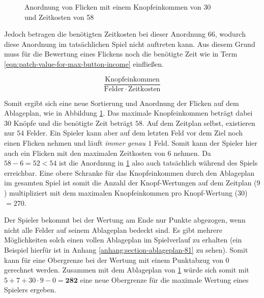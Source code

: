 \begin{figure}[!ht]
\begin{minipage}{.48\textwidth}
        \captionsetup{format=plain, singlelinecheck=false}
        \setcapindent{0pt}
        \caption{Anordnung von Flicken mit einem Knopfeinkommen von 30 \\ und Zeitkosten von 58}
        \label{fig:quilt-board-real-max-button-income}
    \end{minipage}
\end{figure}

Jedoch betragen die benötigten Zeitkosten bei dieser Anordnung $66$, wodurch diese Anordnung im tatsächlichen Spiel nicht auftreten kann. Aus diesem Grund muss für die Bewertung eines Flickens noch die benötigte Zeit wie in Term \ref{eqn:patch-value-for-max-button-income} einfließen.

\begin{equation}
    \label{eqn:patch-value-for-max-button-income}
    \frac{\text{Knopfeinkommen}}{\text{Felder}\, \cdot\, \text{Zeitkosten}}
\end{equation}

Somit ergibt sich eine neue Sortierung und Anordnung der Flicken auf dem Ablageplan, wie in Abbildung \ref{fig:quilt-board-real-max-button-income}. Das maximale Knopfeinkommen beträgt dabei $30$ Knöpfe und die benötigte Zeit beträgt $58$. Auf dem Zeitplan selbst, existieren nur $54$ Felder. Ein Spieler kann aber auf dem letzten Feld vor dem Ziel noch einen Flicken nehmen und läuft \emph{immer genau $1$} Feld. Somit kann der Spieler hier auch ein Flicken mit den maximalen Zeitkosten von $6$ nehmen. Da $58 - 6 = 52 < 54$ ist die Anordnung in \ref{fig:quilt-board-real-max-button-income} also auch tatsächlich während des Spiels erreichbar. Eine obere Schranke für das Knopfeinkommen durch den Ablageplan im gesamten Spiel ist somit die Anzahl der Knopf-Wertungen auf dem Zeitplan ($9$) multipliziert mit dem maximalen Knopfeinkommen pro Knopf-Wertung ($30$) $= 270$.

Der Spieler bekommt bei der Wertung am Ende nur Punkte abgezogen, wenn nicht alle Felder auf seinem Ablageplan bedeckt sind. Es gibt mehrere Möglichkeiten solch einen vollen Ablageplan im Spielverlauf zu erhalten (ein Beispiel hierfür ist in Anhang \ref{anhang:section-ablageplan-81} zu sehen). Somit kann für eine Obergrenze bei der Wertung mit einem Punktabzug von 0 gerechnet werden. Zusammen mit dem Ablageplan von \ref{fig:quilt-board-real-max-button-income} würde sich somit mit $5 + 7 + 30 \cdot 9 - 0 = \boldsymbol{282}$ eine neue Obergrenze für die maximale Wertung eines Spielers ergeben.

